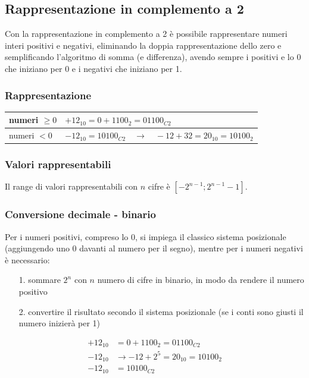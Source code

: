 \documentclass[a4paper]{article}
\begin{document}
\newpage


\subsection{Rappresentazione in complemento a 2}
Con la rappresentazione in complemento a 2 è possibile rappresentare numeri interi positivi e negativi, eliminando la
doppia rappresentazione dello zero e semplificando l'algoritmo di somma (e differenza), avendo sempre i positivi e lo
0 che iniziano per 0 e i negativi che iniziano per 1.

\subsubsection*{Rappresentazione}
\begin{center}
	\begin{tabularx}{\textwidth}{l X}
		numeri \(\geq 0\) & \(+12_{10} = 0 + 1100_2 = 01100_{C2}\) \\
		\midrule
		numeri \(< 0\) & \(-12_{10} = 10100_{C2} \quad \rightarrow \quad -12 + 32 = 20_{10} = 10100_{2}\)
	\end{tabularx}
\end{center}

\subsubsection*{Valori rappresentabili}
Il range di valori rappresentabili con \(n\) cifre è \(\left[ - 2^{n - 1}; 2^{n - 1} - 1 \right]\).

\subsubsection*{Conversione decimale - binario}
Per i numeri positivi, compreso lo 0, si impiega il classico sistema posizionale (aggiungendo uno 0 davanti al
numero per il segno), mentre per i numeri negativi è necessario:
\begin{itemize}[topsep=3pt, itemsep=0pt]
	\item[1.] sommare \(2^n\) con \(n\) numero di cifre in binario, in modo da rendere il numero positivo
	\item[2.] convertire il risultato secondo il sistema posizionale (se i conti sono giusti il numero inizierà per 1)
\end{itemize}
\begin{align*}
	+12_{10} &= 0 + 1100_2 = 01100_{C2} \\
	-12_{10} &\rightarrow -12 + 2^5 = 20_{10} = 10100_{2} \\
	-12_{10} &= 10100_{C2}
\end{align*}
\end{document}
